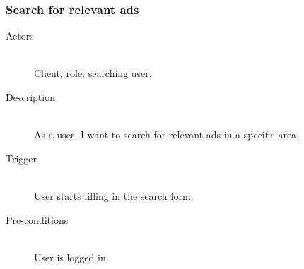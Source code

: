 \documentclass[a4wide]{article}
\begin{document}
\subsubsection{Search for relevant ads}
\begin{description}
\item[Actors] \mbox{}\\ Client; role: searching user.
\item[Description]\mbox{}\\
As a user, I want to search for relevant ads in a specific area.

\item[Trigger]\mbox{}\\
User starts filling in the search form.

\item[Pre-conditions]\mbox{}\\
User is logged in.


\end{description}
\end{document}
